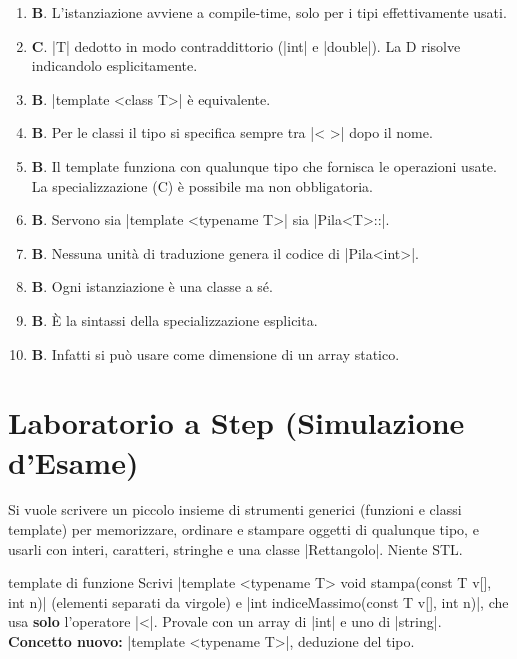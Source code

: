 \begin{soluzione}
\begin{enumerate}[label=\textbf{\arabic*.}]
  \item \textbf{B}. L'istanziazione avviene a compile-time, solo per i tipi effettivamente usati.
  \item \textbf{C}. \cc|T| dedotto in modo contraddittorio (\cc|int| e \cc|double|). La D
        risolve indicandolo esplicitamente.
  \item \textbf{B}. \cc|template <class T>| è equivalente.
  \item \textbf{B}. Per le classi il tipo si specifica sempre tra \cc|< >| dopo il nome.
  \item \textbf{B}. Il template funziona con qualunque tipo che fornisca le operazioni
        usate. La specializzazione (C) è possibile ma non obbligatoria.
  \item \textbf{B}. Servono sia \cc|template <typename T>| sia \cc|Pila<T>::|.
  \item \textbf{B}. Nessuna unità di traduzione genera il codice di \cc|Pila<int>|.
  \item \textbf{B}. Ogni istanziazione è una classe a sé.
  \item \textbf{B}. È la sintassi della specializzazione esplicita.
  \item \textbf{B}. Infatti si può usare come dimensione di un array statico.
\end{enumerate}
\end{soluzione}

\section{Laboratorio a Step (Simulazione d'Esame)}

\begin{traccia}
Si vuole scrivere un piccolo insieme di strumenti generici (funzioni e classi
template) per memorizzare, ordinare e stampare oggetti di qualunque tipo, e usarli
con interi, caratteri, stringhe e una classe \cc|Rettangolo|. Niente STL.
\end{traccia}

\begin{step}{template di funzione}
Scrivi \cc|template <typename T> void stampa(const T v[], int n)| (elementi separati
da virgole) e \cc|int indiceMassimo(const T v[], int n)|, che usa \textbf{solo}
l'operatore \cc|<|. Provale con un array di \cc|int| e uno di \cc|string|.\\[0.3em]
\textbf{Concetto nuovo:} \cc|template <typename T>|, deduzione del tipo.
\end{step}


